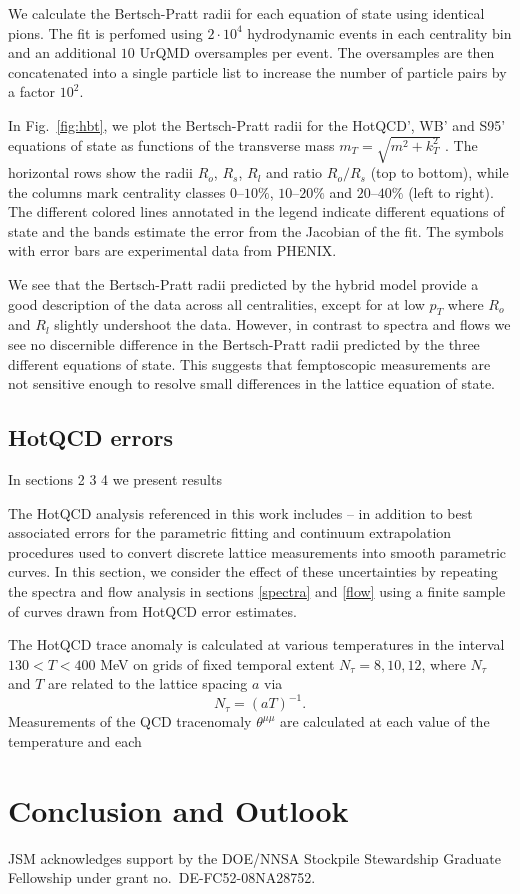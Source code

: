\documentclass[aps,prc,reprint,amsmath,nofootinbib,superscriptaddress]{revtex4-1}
\begin{document}
We calculate the Bertsch-Pratt radii for each equation of state using identical pions. The fit is perfomed using $2\cdot10^4$ hydrodynamic events in each centrality bin and an additional $10$ UrQMD oversamples per event. 
The oversamples are then concatenated into a single particle list to increase the number of particle pairs by a factor $10^2$.

In Fig.~\ref{fig:hbt}, we plot the Bertsch-Pratt radii for the HotQCD', WB' and S95' equations of state as functions of the transverse mass $m_T = \sqrt{m^2 + k_T^2}$ . The horizontal rows show the radii $R_o$, $R_s$, $R_l$ and ratio $R_o/R_s$ (top to bottom), while the columns 
mark centrality classes $0$--$10\%$, $10$--$20\%$ and $20$--$40\%$ (left to right). The different colored lines annotated in the legend indicate different equations of state and the bands estimate the error from the Jacobian 
of the fit. The symbols with error bars are experimental data from PHENIX.

We see that the Bertsch-Pratt radii predicted by the hybrid model provide a good description of the data across all centralities, except for at low $p_T$ where $R_o$ and $R_l$ slightly undershoot the data. However, in contrast to
spectra and flows we see no discernible difference in the Bertsch-Pratt radii predicted by the three different equations of state. This suggests that femptoscopic measurements are not sensitive enough to resolve small differences
in the lattice equation of state.
 
\subsection{HotQCD errors}
\label{errors}

In sections 2 3 4 we present results 

The HotQCD analysis referenced in this work includes -- in addition to best associated errors for the parametric fitting and continuum extrapolation procedures used to convert discrete lattice measurements into smooth parametric curves. In this 
section, we consider the effect of these uncertainties by repeating the spectra and flow analysis in sections \ref{spectra} and \ref{flow} using a finite sample of curves drawn
from HotQCD error estimates.

The HotQCD trace anomaly is calculated at various temperatures in the interval $130 < T < 400$ MeV on grids of fixed temporal extent $N_\tau = 8,10,12$, where $N_\tau$ and $T$ are related to the lattice spacing $a$ via
\begin{equation}
 N_\tau = (aT)^{-1}.
\end{equation}
Measurements of the QCD tracenomaly $\theta^{\mu\mu}$ are calculated at each value of the temperature and each




\section{Conclusion and Outlook}

\begin{acknowledgments}
 JSM acknowledges support by the DOE/NNSA Stockpile Stewardship Graduate Fellowship under grant no.~DE-FC52-08NA28752.
\end{acknowledgments}


\end{document}
